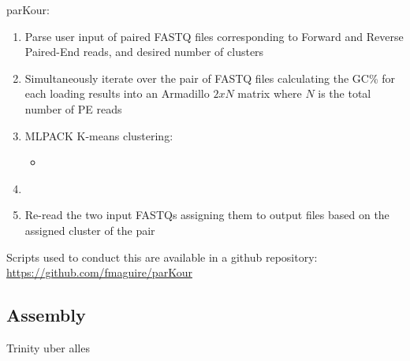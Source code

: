 parKour:
\begin{enumerate}
    \item Parse user input of paired FASTQ files corresponding to Forward and Reverse Paired-End reads, and desired number of clusters
    \item Simultaneously iterate over the pair of FASTQ files calculating the GC\% for each loading results into an Armadillo \(2xN\) matrix where \(N\) is the total number of PE reads
    \item MLPACK K-means clustering:
        \begin{itemize}
            \item \
        \end{itemize}
    \item 
    \item Re-read the two input FASTQs assigning them to output files based on the assigned cluster of the pair
\end{enumerate}



Scripts used to conduct this are available in a github repository:
\url{https://github.com/fmaguire/parKour}



\subsection{Assembly}

Trinity uber alles



